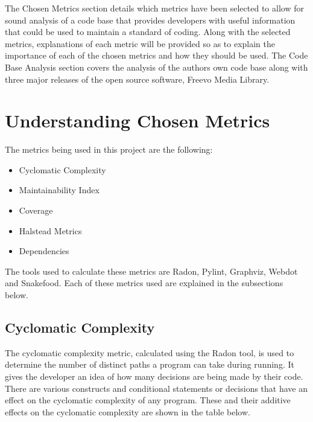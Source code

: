 \documentclass[11pt,journal, a4paper]{IEEEtran}
\begin{document}
\noindent
The Chosen Metrics section details which metrics have been selected to allow for sound analysis of a code base that provides developers with useful information that could be used to maintain a standard of coding. Along with the selected metrics, explanations of each metric will be provided so as to explain the importance of each of the chosen metrics and how they should be used. The Code Base Analysis section covers the analysis of the authors own code base along with three major releases of the open source software, Freevo Media Library. 



\section{Understanding Chosen Metrics}
\noindent
The metrics being used in this project are the following:
\begin{itemize}
\item Cyclomatic Complexity
\item Maintainability Index
\item Coverage
\item Halstead Metrics
\item Dependencies
\end{itemize}
\noindent
The tools used to calculate these metrics are Radon, Pylint, Graphviz, Webdot and Snakefood. Each of these metrics used are explained in the subsections below.

\subsection{Cyclomatic Complexity}
\noindent
The cyclomatic complexity metric, calculated using the Radon tool, is used to determine the number of distinct paths a program can take during running. It gives the developer an idea of how many decisions are being made by their code. There are various constructs and conditional statements or decisions that have an effect on the cyclomatic complexity of any program. These and their additive  effects on the cyclomatic complexity are shown in the table below. 
\end{document}
